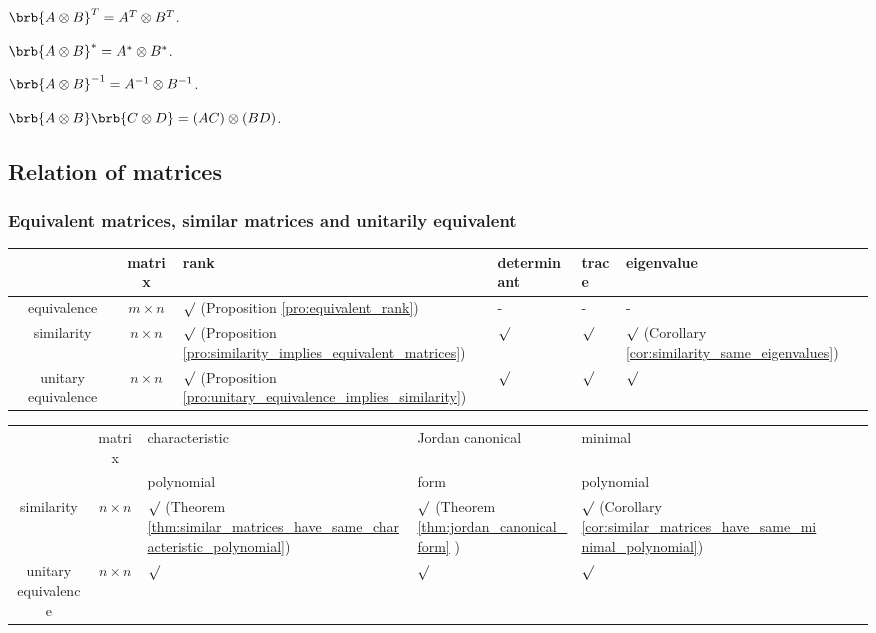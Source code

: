 \ben
\item [(i)] $\brb{A\otimes B}^T =  A^T\otimes B^T$.
\item [(Ii)] $\brb{A\otimes B}^* =  A^*\otimes B^*$.
\item [(iii)] $\brb{A\otimes B}^{-1} =  A^{-1}\otimes B^{-1}$.
\item [(iv)] $\brb{A\otimes B}\brb{C\otimes D} = (AC) \otimes (BD)$.
\een

\subsection{Relation of matrices}

\subsubsection{Equivalent matrices, similar matrices and unitarily equivalent}

\begin{center}
\begin{tabular}{ccllll}
\hline
 & matrix  & rank & determinant & trace & eigenvalue \\\hline
equivalence & $m \times n$ & $\surd$ (Proposition \ref{pro:equivalent_rank}) & - & - & -  \\
similarity & $n\times n$ & $\surd$ (Proposition \ref{pro:similarity_implies_equivalent_matrices}) & $\surd$ & $\surd$  & $\surd$ (Corollary \ref{cor:similarity_same_eigenvalues})  \\
unitary equivalence & $n\times n$ & $\surd$ (Proposition \ref{pro:unitary_equivalence_implies_similarity}) & $\surd$ & $\surd$ & $\surd$  \\
\hline
\end{tabular}
\end{center}


\begin{center}
\begin{tabular}{ccllllll}
\hline
 & matrix  & characteristic  & Jordan canonical & minimal & & &  \\
 &  & polynomial & form & polynomial & & &  \\
 \hline
similarity & $n\times n$ & $\surd$ (Theorem \ref{thm:similar_matrices_have_same_characteristic_polynomial}) & $\surd$ (Theorem \ref{thm:jordan_canonical_form} ) & $\surd$ (Corollary \ref{cor:similar_matrices_have_same_minimal_polynomial}) & & & \\
unitary equivalence & $n\times n$ & $\surd$ & $\surd$ & $\surd$ & & & \\
\hline
\end{tabular}
\end{center}

